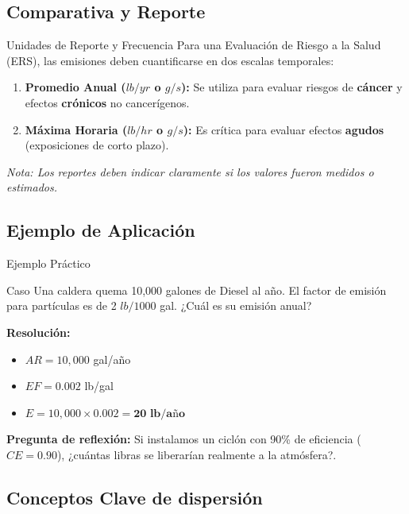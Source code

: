 \documentclass[10pt,compress]{beamer}
\begin{document}
\subsection{Comparativa y Reporte}

\begin{frame}{Unidades de Reporte y Frecuencia}
    Para una Evaluación de Riesgo a la Salud (ERS), las emisiones deben cuantificarse en dos escalas temporales:
    
    \begin{enumerate}
        \item \textbf{Promedio Anual ($lb/yr$ o $g/s$):} Se utiliza para evaluar riesgos de \textbf{cáncer} y efectos \textbf{crónicos} no cancerígenos.
        \item \textbf{Máxima Horaria ($lb/hr$ o $g/s$):} Es crítica para evaluar efectos \textbf{agudos} (exposiciones de corto plazo).
    \end{enumerate}
    
    \textit{Nota: Los reportes deben indicar claramente si los valores fueron medidos o estimados.}
\end{frame}

\subsection{Ejemplo de Aplicación}

\begin{frame}{Ejemplo Práctico}
    \begin{exampleblock}{Caso}
        Una caldera quema 10,000 galones de Diesel al año. El factor de emisión para partículas es de 2 $lb/1000$ gal. ¿Cuál es su emisión anual?
    \end{exampleblock}
    
    \textbf{Resolución:}
    \begin{itemize}
        \item $AR = 10,000$ gal/año
        \item $EF = 0.002$ lb/gal
        \item $E = 10,000 \times 0.002 = \textbf{20 lb/año}$
    \end{itemize}
    \vspace{1em}
    \textbf{Pregunta de reflexión:} Si instalamos un ciclón con 90\% de eficiencia ($CE=0.90$), ¿cuántas libras se liberarían realmente a la atmósfera?.
\end{frame}

\subsection{Conceptos Clave de dispersión}
\end{document}
